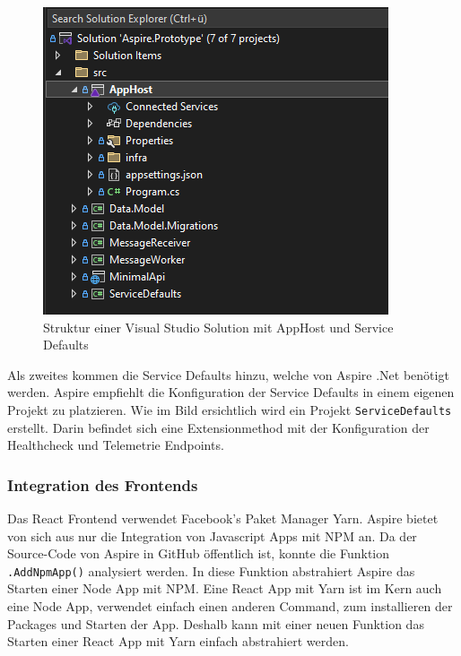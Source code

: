             \begin{figure}[ht]
                \centering
                \includegraphics[scale=1]{Ressources/Bilder/Porjektstruktur.AppHost.png}
                \caption{Struktur einer Visual Studio Solution mit AppHost und Service Defaults}
                \label{fig:solution-struc}
            \end{figure}            

            Als zweites kommen die Service Defaults hinzu, welche von Aspire .Net benötigt werden. Aspire empfiehlt die Konfiguration der Service Defaults in einem eigenen Projekt zu platzieren. Wie im Bild ersichtlich wird ein Projekt \verb|ServiceDefaults| erstellt. Darin befindet sich eine Extensionmethod mit der Konfiguration der Healthcheck und Telemetrie Endpoints.

        \subsubsection{Integration des Frontends}

            Das React Frontend verwendet Facebook's Paket Manager Yarn. Aspire bietet von sich aus nur die Integration von Javascript Apps mit NPM an. Da der Source-Code von Aspire in GitHub öffentlich ist, konnte die Funktion \verb|.AddNpmApp()| analysiert werden. In diese Funktion abstrahiert Aspire das Starten einer Node App mit NPM. Eine React App mit Yarn ist im Kern auch eine Node App, verwendet einfach einen anderen Command, zum installieren der Packages und Starten der App. Deshalb kann mit einer neuen Funktion das Starten einer React App mit Yarn einfach abstrahiert werden.

